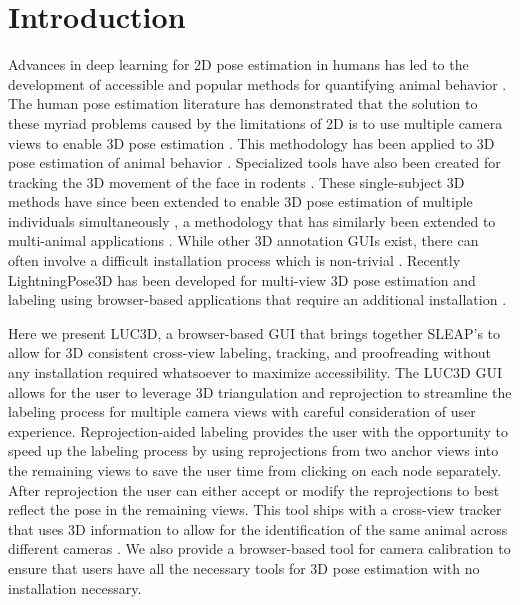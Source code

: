 \documentclass[pdflatex, sn-nature]{sn-jnl}
\theoremstyle{thmstyleone}%
\theoremstyle{thmstyletwo}%
\theoremstyle{thmstylethree}%
\begin{document}
\section{Introduction}\label{sec1}

Advances in deep learning for 2D pose estimation in humans has led to the development of accessible and popular methods for quantifying animal behavior \citep{Mathis2018,Pereira2020,Pereira2022,Biderman2024}. The human pose estimation literature has demonstrated that the solution to these myriad problems caused by the limitations of 2D is to use multiple camera views to enable 3D pose estimation \citep{Iskakov2019}. This methodology has been applied to 3D pose estimation of animal behavior \citep{Dunn2021,Karashchuk2021}. Specialized tools have also been created for tracking the 3D movement of the face in rodents \citep{Daruwalla2026}. These single-subject 3D methods have since been extended to enable 3D pose estimation of multiple individuals simultaneously \citep{Huang2020,Chen2020}, a methodology that has similarly been extended to multi-animal applications \citep{Marshall2021,Marshall2022}. While other 3D annotation GUIs exist, there can often involve a difficult installation process which is non-trivial \citep{Hueser2023}. Recently LightningPose3D has been developed for multi-view 3D pose estimation and labeling using browser-based applications that require an additional installation \citep{Aharon2026}. 

Here we present LUC3D, a browser-based GUI that brings together SLEAP's to allow for 3D consistent cross-view labeling, tracking, and proofreading without any installation required whatsoever to maximize accessibility. The LUC3D GUI allows for the user to leverage 3D triangulation and reprojection to streamline the labeling process for multiple camera views with careful consideration of user experience. Reprojection-aided labeling provides the user with the opportunity to speed up the labeling process by using reprojections from two anchor views into the remaining views to save the user time from clicking on each node separately. After reprojection the user can either accept or modify the reprojections to best reflect the pose in the remaining views. This tool ships with a cross-view tracker that uses 3D information to allow for the identification of the same animal across different cameras \citep{Maree2024}. We also provide a browser-based tool for camera calibration to ensure that users have all the necessary tools for 3D pose estimation with no installation necessary. 
\end{document}
